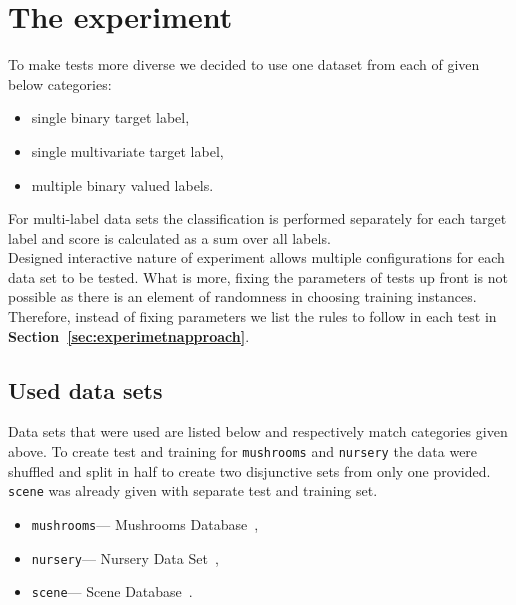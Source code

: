 \documentclass[12pt, a4paper, pdflatex]{report}
\begin{document}
\section{The experiment}
To make tests more diverse we decided to use one dataset from each of given below categories:
\begin{itemize}
\item single binary target label,
\item single multivariate target label,%
\item multiple binary valued labels.
\end{itemize}
For multi-label data sets the classification is performed separately for each target label and score is calculated as a sum over all labels.\\
Designed interactive nature of experiment allows multiple configurations for each data set to be tested. What is more, fixing the parameters of tests up front is not possible as there is an element of randomness in choosing training instances. Therefore, instead of fixing parameters we list the rules to follow in each test in \textbf{Section~\ref{sec:experimetnapproach}}.

\subsection{Used data sets}
Data sets that were used are listed below and respectively match categories given above. To create test and training for \texttt{mushrooms} and \texttt{nursery} the data were shuffled and split in half to create two disjunctive sets from only one provided. \texttt{scene} was already given with separate test and training set.
\begin{itemize}
\item \texttt{mushrooms}--- Mushrooms Database~\cite{mushroomsDS},
\item \texttt{nursery}--- Nursery Data Set~\cite{nurseryDS},
\item \texttt{scene}--- Scene Database~\cite{sceneDS}.
\end{itemize}
\end{document}

